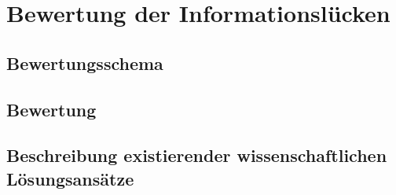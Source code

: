 \chapter{Bewertung der Informationslücken}
\label{cha:Bewertung der Informationslücken}
\section{Bewertungsschema}
\section{Bewertung}
\section{Beschreibung existierender wissenschaftlichen Lösungsansätze}